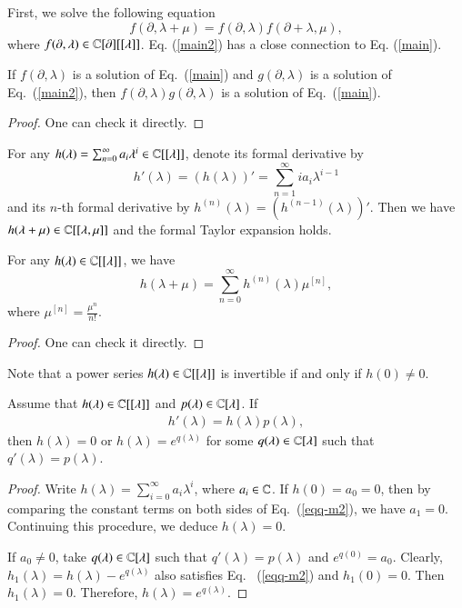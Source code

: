 \documentclass[12pt]{amsart}
\begin{document}
First, we solve the following equation
\begin{equation}\label{main2}
f(\partial, \lambda+\mu)=f(\partial, \lambda)f(\partial+\lambda,\mu),
\end{equation}
where $f(\partial, \lambda)\in \mathbb{C}[\partial][[\lambda]]$. Eq. (\ref{main2}) has a close connection to Eq. (\ref{main}).
\begin{lem}\label{lem-em3}
If $f(\partial, \lambda)$ is a solution of Eq.~(\ref{main}) and $g(\partial, \lambda)$ is a solution of Eq.~(\ref{main2}), then $f(\partial, \lambda)g(\partial, \lambda)
$ is a solution of Eq.~(\ref{main}).
\end{lem}
\begin{proof}
One can check it directly.
\end{proof}
For any $h(\lambda)=\sum_{n=0}^{\infty}a_i \lambda^i\in \mathbb{C}[[\lambda]]$,
denote its formal derivative by
$$h'(\lambda)=(h(\lambda))'=\sum_{n=1}^{\infty}ia_i \lambda^{i-1}$$
and its $n$-th formal derivative by
$h^{(n)}(\lambda)=(h^{(n-1)}(\lambda))'$.
Then
we have $h(\lambda+\mu)\in \mathbb{C}[[\lambda,\mu]]$ and the formal Taylor expansion holds.
\begin{lem}\label{lem-FT}
For any $h(\lambda)\in \mathbb{C}[[\lambda]]$, we have
\[
h(\lambda+\mu)=\sum_{n=0}^{\infty} h^{(n)}(\lambda)\mu^{[n]},
\]
where $\mu^{[n]}=\frac{ \mu^{n}}{n!}$.
\end{lem}
\begin{proof}
One can check it directly.
\end{proof}
Note that a power series $h(\lambda)\in \mathbb{C}[[\lambda]]$ is invertible if and only if $h(0)\neq0$.
\begin{lem}\label{lem-em1}
Assume that $h(\lambda)\in \mathbb{C}[[\lambda]]$ and $p(\lambda)\in \mathbb{C}[\lambda]$. If
\begin{eqnarray}
\label{eqq-m2}h'(\lambda)=h(\lambda)p(\lambda),
\end{eqnarray} then
$h(\lambda)=0$ or $h(\lambda)=e^{q(\lambda)}$ for some $q(\lambda)\in \mathbb{C}[\lambda]$ such that $q'(\lambda)=p(\lambda)$.
\end{lem}
\begin{proof}
Write $h(\lambda)=\sum_{i=0}^{\infty}a_i \lambda^i$, where $a_i\in \mathbb{C}$.
If $h(0)=a_0=0$, then by comparing the constant terms on both sides of Eq.~(\ref{eqq-m2}), we have $a_1=0$. Continuing this procedure, we deduce $h(\lambda)=0$.

If $a_0\neq 0$, take $q(\lambda)\in \mathbb{C}[\lambda]$ such that $q'(\lambda)=p(\lambda)$ and $e^{q(0)}=a_0$.
Clearly, $h_1(\lambda)=h(\lambda)-e^{q(\lambda)}$ also satisfies Eq.~ (\ref{eqq-m2}) and $h_1(0)=0$. Then $h_1(\lambda)=0$. Therefore, $h(\lambda)=e^{q(\lambda)}$.
\end{proof}
\end{document}
